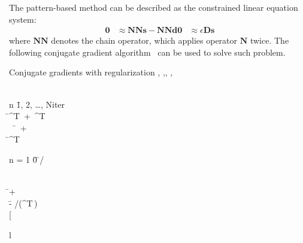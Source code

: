 The pattern-based method can be described as the constrained linear
equation system:
\begin{equation}
    \begin{aligned}
        \mathbf{0} & \approx \mathbf{NNs} - \mathbf{NNd}
        \mathbf{0} & \approx \epsilon \mathbf{Ds}
    \end{aligned}
\end{equation}
where $\mathbf{NN}$ denotes the chain operator, which applies operator
$\mathbf{N}$ twice. The following conjugate gradient algorithm~\cite[]{Wang16}
can be used to solve such problem.
\begin{algorithm}{Conjugate gradients with regularization}
    {, ,, ,\epsilon}
     \\
     \\
    \begin{FOR}{n \= 1, 2, \ldots, Niter} \\
         \= ^T\, + \epsilon\,^{T}\,\\\
         \= \, + \epsilon\,\,\\
        \rho \= \mathbf{g}^T\,\mathbf{g} \\
        \begin{IF}{n = 1}
            \beta \= 0
            \ELSE
            \beta \= \rho/\hat{\rho}
        \end{IF} \\
         \=
         + \beta\,
         \\
        \alpha \= - \rho/(^T\,) \\
        \left[\begin{array}{l}
                 \\

\end{array}
\end{FOR}
\end{algorithm}
